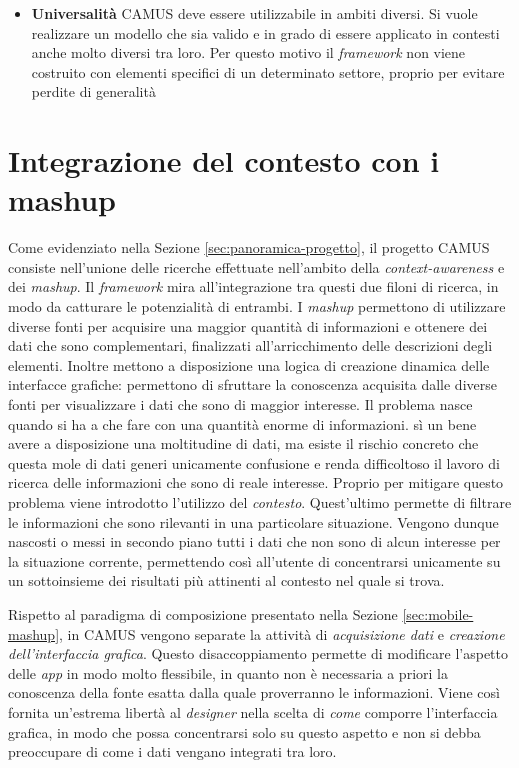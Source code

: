 \begin{itemize}
	\item \textbf{Universalità}
	CAMUS deve essere utilizzabile in ambiti diversi. Si vuole realizzare un modello che sia valido e in grado di essere applicato in contesti anche molto diversi tra loro. Per questo motivo il \emph{framework} non viene costruito con elementi specifici di un determinato settore, proprio per evitare perdite di generalità
\end{itemize}

\section{Integrazione del contesto con i mashup\label{sec:integrazione-contesto-mashup}}

Come evidenziato nella Sezione \ref{sec:panoramica-progetto}, il progetto CAMUS consiste nell'unione delle ricerche effettuate nell'ambito della \emph{context-awareness} e dei \emph{mashup}. Il \emph{framework} mira all'integrazione tra questi due filoni di ricerca, in modo da catturare le potenzialità di entrambi. I \emph{mashup} permettono di utilizzare diverse fonti per acquisire una maggior quantità di informazioni e ottenere dei dati che sono complementari, finalizzati all'arricchimento delle descrizioni degli elementi. Inoltre mettono a disposizione una logica di creazione dinamica delle interfacce grafiche: permettono di sfruttare la conoscenza acquisita dalle diverse fonti per visualizzare i dati che sono di maggior interesse. Il problema nasce quando si ha a che fare con una quantità enorme di informazioni. \upe sì un bene avere a disposizione una moltitudine di dati, ma esiste il rischio concreto che questa mole di dati generi unicamente confusione e renda difficoltoso il lavoro di ricerca delle informazioni che sono di reale interesse. Proprio per mitigare questo problema viene introdotto l'utilizzo del \emph{contesto}. Quest'ultimo permette di filtrare le informazioni che sono rilevanti in una particolare situazione. Vengono dunque nascosti o messi in secondo piano tutti i dati che non sono di alcun interesse per la situazione corrente, permettendo così all'utente di concentrarsi unicamente su un sottoinsieme dei risultati più attinenti al contesto nel quale si trova.

Rispetto al paradigma di composizione presentato nella Sezione \ref{sec:mobile-mashup}, in CAMUS vengono separate la attività di \emph{acquisizione dati} e \emph{creazione dell'interfaccia grafica}. Questo disaccoppiamento permette di modificare l'aspetto delle \emph{app} in modo molto flessibile, in quanto non è necessaria a priori la conoscenza della fonte esatta dalla quale proverranno le informazioni. Viene così fornita un'estrema libertà al \emph{designer} nella scelta di \emph{come} comporre l'interfaccia grafica, in modo che possa concentrarsi solo su questo aspetto e non si debba preoccupare di come i dati vengano integrati tra loro.

